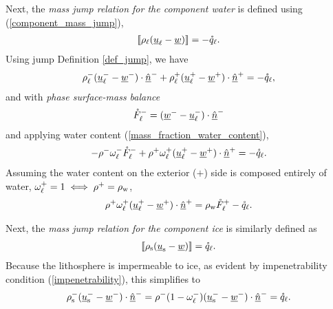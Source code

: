 Next, the \emph{mass jump relation for the component water} is defined using (\ref{component_mass_jump}),
\begin{align*}
  \left\llbracket { \rho_{\mathrm{\ell}} (\underline{u}_{\mathrm{\ell}} - \underline{w}) } \right\rrbracket = - \mathring{q}_{\mathrm{\ell}}.
\end{align*}
Using jump Definition \ref{def_jump}, we have
\begin{align*}
  \rho_{\mathrm{\ell}}^- (\underline{u}_{\mathrm{\ell}}^- - \underline{w}^-) \cdot \underline{\hat{n}}^- + \rho_{\mathrm{\ell}}^+ (\underline{u}_{\mathrm{\ell}}^+ - \underline{w}^+) \cdot \underline{\hat{n}}^+ = - \mathring{q}_{\mathrm{\ell}},
\end{align*}
and with \emph{phase surface-mass balance} 
\begin{align}
  \label{liquid_smb}
  \mathring{F}_{\mathrm{\ell}}^- = (\underline{w}^- - \underline{u}_{\mathrm{\ell}}^-) \cdot \underline{\hat{n}}^-
\end{align}
and applying water content (\ref{mass_fraction_water_content}),
\begin{align*}
  - \rho^- \omega_{\mathrm{\ell}}^- \mathring{F}_{\mathrm{\ell}}^- + \rho^+ \omega_{\mathrm{\ell}}^+ (\underline{u}_{\mathrm{\ell}}^+ - \underline{w}^+) \cdot \underline{\hat{n}}^+ = - \mathring{q}_{\mathrm{\ell}}.
\end{align*}
Assuming the water content on the exterior ($+$) side is composed entirely of water, $\omega_{\mathrm{\ell}}^+ = 1 \iff \rho^+ = \rho_{\mathrm{w}}$,
\begin{align}
  \label{component_water_jump}
  \rho^+ \omega_{\mathrm{\ell}}^+ (\underline{u}_{\mathrm{\ell}}^+ - \underline{w}^+) \cdot \underline{\hat{n}}^+ = \rho_{\mathrm{w}} \mathring{F}_{\mathrm{\ell}}^+ - \mathring{q}_{\mathrm{\ell}}.
\end{align}

Next, the \emph{mass jump relation for the component ice} is similarly defined as
\begin{align*}
  \left\llbracket { \rho_{\mathrm{s}} (\underline{u}_{\mathrm{s}} - \underline{w}) } \right\rrbracket = \mathring{q}_{\mathrm{\ell}}.
\end{align*}
Because the lithosphere is impermeable to ice, as evident by impenetrability condition (\ref{impenetrability}), this simplifies to
\begin{align}
  \label{component_ice_jump}
  \rho_{\mathrm{s}}^- (\underline{u}_{\mathrm{s}}^- - \underline{w}^-) \cdot \underline{\hat{n}}^- = \rho^- (1-\omega_{\mathrm{\ell}}^-) (\underline{u}_{\mathrm{s}}^- - \underline{w}^-) \cdot \underline{\hat{n}}^- = \mathring{q}_{\mathrm{\ell}}.
\end{align}

